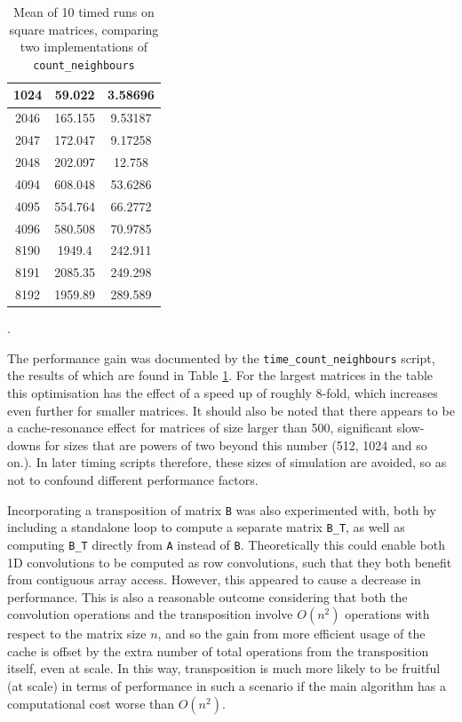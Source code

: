 \documentclass[12pt]{article}
\begin{document}
\begin{table}[hp]
{\begin{tabular}{| c | c | c |}
        1024 & 59.022      &    3.58696    \\
        \hline
        2046 & 165.155     &    9.53187    \\
        2047 & 172.047     &    9.17258    \\
        2048 & 202.097     &    12.758     \\
        \hline
        4094 & 608.048     &    53.6286    \\
        4095 & 554.764     &    66.2772    \\
        4096 & 580.508     &    70.9785    \\
        \hline
        8190 & 1949.4      &    242.911    \\
        8191 & 2085.35     &    249.298    \\
        8192 & 1959.89     &    289.589    \\
        \hline

    \end{tabular}
    }
    \caption{Mean of 10 timed runs on square matrices, comparing two implementations of \texttt{count\_neighbours}}.
    \label{tab:sepconvtime}
\end{table}


The performance gain was documented by the \texttt{time\_count\_neighbours} script, the results of which are found in Table \ref{tab:sepconvtime}.
For the largest matrices in the table this optimisation has the effect of a speed up of roughly 8-fold,
which increases even further for smaller matrices.
It should also be noted that there appears to be a cache-resonance effect for matrices of size larger than 500,
significant slow-downs for sizes that are powers of two beyond this number (512, 1024 and so on.).
In later timing scripts therefore, these sizes of simulation are avoided, so as not to confound different performance factors.

Incorporating a transposition of matrix \texttt{B} was also experimented with, both by including a standalone loop to compute a separate matrix \texttt{B\_T},
as well as computing \texttt{B\_T} directly from \texttt{A} instead of \texttt{B}.
Theoretically this could enable both 1D convolutions to be computed as row convolutions,
such that they both benefit from contiguous array access.
However, this appeared to cause a decrease in performance.
This is also a reasonable outcome considering that both the convolution operations and the transposition involve $O(n^2)$ operations with respect to the matrix size $n$,
and so the gain from more efficient usage of the cache is offset by the extra number of total operations from the transposition itself, even at scale.
In this way, transposition is much more likely to be fruitful (at scale) in terms of performance in such a scenario if the main algorithm has a computational cost worse than $O(n^2)$.
\end{document}
